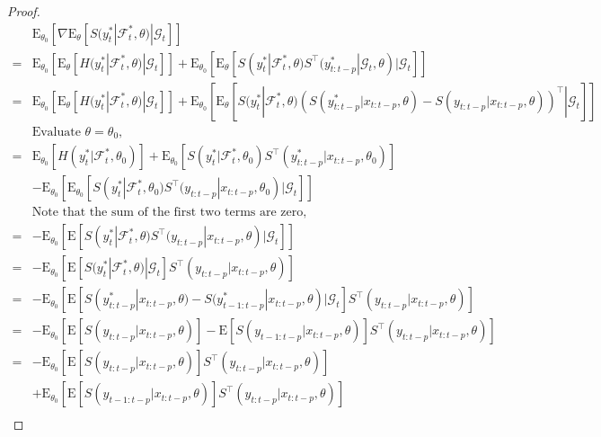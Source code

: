 \documentclass[a4paper,12pt]{article}
\newcommand{\E}{\mathop{\mathbb{E}}}
\def \trans{^\intercal}
\def \E{\mbox{E}}
\def \F {\mathcal{F}}
\def \G {\mathcal{G}}
\begin{document}
\begin{proof}

\begin{align*}
&\E_{\theta_0}\left[ \nabla \E_\theta\left[S(y_t^*|\F_t^*,\theta) | \G_t\right] \right]\\
=&\E_{\theta_0} \left[ \E_\theta\left[ H(y_t^*|\F_t^*,\theta)|\G_t \right] \right]
+\E_{\theta_0}\left[ \E_\theta\left[ S(y_t^*|\F_t^*,\theta) S\trans(y_{t:t-p}^* |\G_t,\theta) | \G_t \right]\right]\\
=&\E_{\theta_0} \left[ \E_\theta\left[ H(y_t^*|\F_t^*,\theta)|\G_t \right] \right]
+\E_{\theta_0}\left[ \E_\theta\left[  S(y_t^*|\F_t^*,\theta) \left( S(y_{t:t-p}^*|x_{t:t-p},\theta) - S(y_{t:t-p}|x_{t:t-p},\theta)\right)\trans|\G_t\right]\right]\\
&\textrm{Evaluate $\theta=\theta_0$,}\\
=&\E_{\theta_0} \left[ H(y_t^*|\F_{t}^*,\theta_0) \right]
+\E_{\theta_0}\left[  S(y_t^*|\F_{t}^*,\theta_0) S\trans(y_{t:t-p}^*|x_{t:t-p},\theta_0)\right]\\
&-\E_{\theta_0}\left[ \E_{\theta_0}\left[  S(y_t^*|\F_{t}^*,\theta_0) S\trans(y_{t:t-p}|x_{t:t-p},\theta_0)|\G_t\right]\right]\\
&\textrm{Note that the sum of the first two terms are zero,}\\
=&-\E_{\theta_0}\left[ \E\left[  S(y_t^*|\F_{t}^*,\theta) S\trans(y_{t:t-p}|x_{t:t-p},\theta)|\G_t\right]\right]\\
=&-\E_{\theta_0}\left[ \E\left[  S(y_t^*|\F_{t}^*,\theta) |\G_t\right]S\trans(y_{t:t-p}|x_{t:t-p},\theta)\right]\\
=&-\E_{\theta_0}\left[ \E\left[  S(y_{t:t-p}^*|x_{t:t-p},\theta) - S(y_{t-1:t-p}^*|x_{t:t-p},\theta) |\G_t\right]S\trans(y_{t:t-p}|x_{t:t-p},\theta)\right]\\
=&-\E_{\theta_0}\left[ \E\left[S(y_{t:t-p}|x_{t:t-p},\theta)\right] -\E\left[S(y_{t-1:t-p}|x_{t:t-p},\theta) \right]S\trans(y_{t:t-p}|x_{t:t-p},\theta)\right]\\
=&-\E_{\theta_0}\left[ \E\left[S(y_{t:t-p}|x_{t:t-p},\theta)\right]S\trans(y_{t:t-p}|x_{t:t-p},\theta)\right]\\
&+\E_{\theta_0}\left[ \E\left[S(y_{t-1:t-p}|x_{t:t-p},\theta) \right]S\trans(y_{t:t-p}|x_{t:t-p},\theta)\right]\\
\end{align*}


\end{proof}
\end{document}

